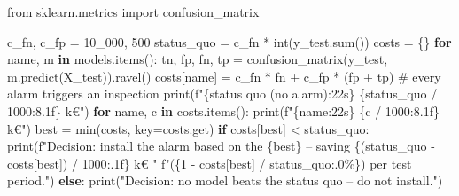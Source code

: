 \documentclass[
  letterpaper,
  DIV=11,
  numbers=noendperiod]{scrreprt}
\newenvironment{Shaded}{\begin{snugshade}}{\end{snugshade}}
\newcommand{\BuiltInTok}[1]{\textcolor[rgb]{0.00,0.23,0.31}{#1}}
\newcommand{\CommentTok}[1]{\textcolor[rgb]{0.37,0.37,0.37}{#1}}
\newcommand{\ControlFlowTok}[1]{\textcolor[rgb]{0.00,0.23,0.31}{\textbf{#1}}}
\newcommand{\DecValTok}[1]{\textcolor[rgb]{0.68,0.00,0.00}{#1}}
\newcommand{\ImportTok}[1]{\textcolor[rgb]{0.00,0.46,0.62}{#1}}
\newcommand{\KeywordTok}[1]{\textcolor[rgb]{0.00,0.23,0.31}{\textbf{#1}}}
\newcommand{\NormalTok}[1]{\textcolor[rgb]{0.00,0.23,0.31}{#1}}
\newcommand{\OperatorTok}[1]{\textcolor[rgb]{0.37,0.37,0.37}{#1}}
\newcommand{\SpecialCharTok}[1]{\textcolor[rgb]{0.37,0.37,0.37}{#1}}
\newcommand{\SpecialStringTok}[1]{\textcolor[rgb]{0.13,0.47,0.30}{#1}}
\newcommand{\StringTok}[1]{\textcolor[rgb]{0.13,0.47,0.30}{#1}}
\begin{document}
\begin{Shaded}
\begin{Highlighting}[]
\ImportTok{from}\NormalTok{ sklearn.metrics }\ImportTok{import}\NormalTok{ confusion\_matrix}

\NormalTok{c\_fn, c\_fp }\OperatorTok{=} \DecValTok{10\_000}\NormalTok{, }\DecValTok{500}
\NormalTok{status\_quo }\OperatorTok{=}\NormalTok{ c\_fn }\OperatorTok{*} \BuiltInTok{int}\NormalTok{(y\_test.}\BuiltInTok{sum}\NormalTok{())}
\NormalTok{costs }\OperatorTok{=}\NormalTok{ \{\}}
\ControlFlowTok{for}\NormalTok{ name, m }\KeywordTok{in}\NormalTok{ models.items():}
\NormalTok{    tn, fp, fn, tp }\OperatorTok{=}\NormalTok{ confusion\_matrix(y\_test, m.predict(X\_test)).ravel()}
\NormalTok{    costs[name] }\OperatorTok{=}\NormalTok{ c\_fn }\OperatorTok{*}\NormalTok{ fn }\OperatorTok{+}\NormalTok{ c\_fp }\OperatorTok{*}\NormalTok{ (fp }\OperatorTok{+}\NormalTok{ tp)          }\CommentTok{\# every alarm triggers an inspection}
\BuiltInTok{print}\NormalTok{(}\SpecialStringTok{f"}\SpecialCharTok{\{}\StringTok{\textquotesingle{}status quo (no alarm)\textquotesingle{}}\SpecialCharTok{:22s\}}\SpecialStringTok{ }\SpecialCharTok{\{}\NormalTok{status\_quo }\OperatorTok{/} \DecValTok{1000}\SpecialCharTok{:8.1f\}}\SpecialStringTok{ k€"}\NormalTok{)}
\ControlFlowTok{for}\NormalTok{ name, c }\KeywordTok{in}\NormalTok{ costs.items():}
    \BuiltInTok{print}\NormalTok{(}\SpecialStringTok{f"}\SpecialCharTok{\{}\NormalTok{name}\SpecialCharTok{:22s\}}\SpecialStringTok{ }\SpecialCharTok{\{}\NormalTok{c }\OperatorTok{/} \DecValTok{1000}\SpecialCharTok{:8.1f\}}\SpecialStringTok{ k€"}\NormalTok{)}
\NormalTok{best }\OperatorTok{=} \BuiltInTok{min}\NormalTok{(costs, key}\OperatorTok{=}\NormalTok{costs.get)}
\ControlFlowTok{if}\NormalTok{ costs[best] }\OperatorTok{\textless{}}\NormalTok{ status\_quo:}
    \BuiltInTok{print}\NormalTok{(}\SpecialStringTok{f"Decision: install the alarm based on the }\SpecialCharTok{\{}\NormalTok{best}\SpecialCharTok{\}}\SpecialStringTok{ – saving }\SpecialCharTok{\{}\NormalTok{(status\_quo }\OperatorTok{{-}}\NormalTok{ costs[best]) }\OperatorTok{/} \DecValTok{1000}\SpecialCharTok{:.1f\}}\SpecialStringTok{ k€ "}
          \SpecialStringTok{f"(}\SpecialCharTok{\{}\DecValTok{1} \OperatorTok{{-}}\NormalTok{ costs[best] }\OperatorTok{/}\NormalTok{ status\_quo}\SpecialCharTok{:.0\%\}}\SpecialStringTok{) per test period."}\NormalTok{)}
\ControlFlowTok{else}\NormalTok{:}
    \BuiltInTok{print}\NormalTok{(}\StringTok{"Decision: no model beats the status quo – do not install."}\NormalTok{)}
\end{Highlighting}
\end{Shaded}
\end{document}
